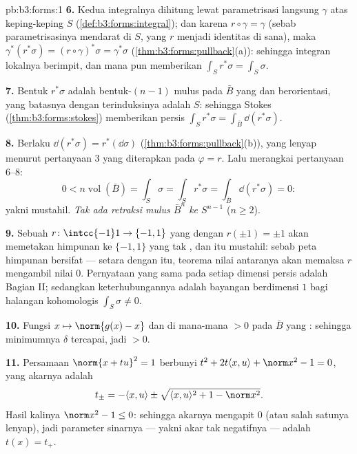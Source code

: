 \begin{solution}{pb:b3:forms:1}
\textbf{6.} Kedua integralnya dihitung lewat parametrisasi
langsung $\gamma$ atas keping-keping $S$
(\cref{def:b3:forms:integral}); dan karena $r\circ\gamma =
\gamma$ (sebab parametrisasinya mendarat di $S$, yang $r$ menjadi
identitas di sana), maka $\gamma^*(r^*\sigma) = (r\circ\gamma)^*\sigma =
\gamma^*\sigma$ (\cref{thm:b3:forms:pullback}(a)): sehingga integran
lokalnya berimpit, dan  mana pun memberikan
$\int_Sr^*\sigma = \int_S\sigma$.

\textbf{7.} Bentuk $r^*\sigma$ adalah bentuk-$(n-1)$ mulus pada
 $\bar B$ yang  dan berorientasi, yang
batasnya dengan  terinduksinya adalah $S$: sehingga Stokes
(\cref{thm:b3:forms:stokes}) memberikan persis
$\int_Sr^*\sigma = \int_{\bar B}\dd(r^*\sigma)$.

\textbf{8.} Berlaku $\dd(r^*\sigma) = r^*(\dd\sigma)$
(\cref{thm:b3:forms:pullback}(b)), yang lenyap menurut
pertanyaan 3 yang diterapkan pada $\varphi = r$. Lalu merangkai pertanyaan
6--8:
\[
0 < n\operatorname{vol}(\bar B) = \int_S\sigma =
\int_Sr^*\sigma = \int_{\bar B}\dd(r^*\sigma) = 0 :
\]
yakni mustahil. \emph{Tak ada retraksi mulus $\bar B^n$
ke $S^{n-1}$} ($n \geq 2$).

\textbf{9.} Sebuah $r\colon\intcc{-1}1\to\{-1,1\}$ yang 
dengan $r(\pm1) = \pm1$ akan memetakan himpunan  ke
$\{-1, 1\}$ yang tak , dan itu mustahil: sebab peta 
himpunan  bersifat  --- setara dengan itu,
teorema nilai antaranya akan memaksa $r$ mengambil nilai
$0$. Pernyataan yang sama pada setiap dimensi persis adalah Bagian
II; sedangkan keterhubungannya adalah bayangan berdimensi $1$ bagi
halangan kohomologis $\int_S\sigma \neq 0$.

\textbf{10.} Fungsi $x \mapsto \norm{g(x) - x}$  dan
di mana-mana $> 0$ pada $\bar B$ yang : sehingga minimumnya
$\delta$ tercapai, jadi $> 0$.

\textbf{11.} Persamaan $\norm{x + tu}^2 = 1$ berbunyi $t^2 + 2t\langle x,
u\rangle + \norm x^2 - 1 = 0$, yang akarnya adalah
\[
t_\pm = -\langle x, u\rangle \pm \sqrt{\langle x,
u\rangle^2 + 1 - \norm x^2} .
\]
Hasil kalinya $\norm x^2 - 1 \leq 0$: sehingga akarnya mengapit
$0$ (atau salah satunya lenyap), jadi parameter sinarnya --- yakni
akar tak negatifnya --- adalah $t(x) = t_+$.


\end{solution}
